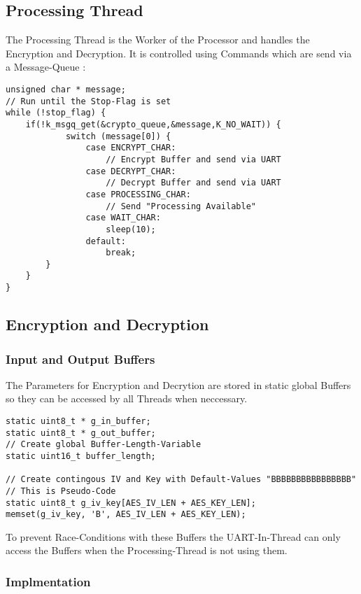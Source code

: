 \pagebreak

\subsection{Processing Thread}

The Processing Thread is the Worker of the Processor and handles the
Encryption and Decryption.
It is controlled using Commands which are send via a Message-Queue :

\begin{lstlisting}[style=CStyle,caption=Processing Thread Pseudo-Code]
unsigned char * message;
// Run until the Stop-Flag is set
while (!stop_flag) {
	if(!k_msgq_get(&crypto_queue,&message,K_NO_WAIT)) {
			switch (message[0]) {
				case ENCRYPT_CHAR:
					// Encrypt Buffer and send via UART
				case DECRYPT_CHAR:
					// Decrypt Buffer and send via UART
				case PROCESSING_CHAR:
					// Send "Processing Available"
				case WAIT_CHAR:
					sleep(10);
				default:
					break;
		}
	}
}
\end{lstlisting}

\subsection{Encryption and Decryption}

\subsubsection{Input and Output Buffers}

The Parameters for Encryption and Decrytion are stored in static global
Buffers so they can be accessed by all Threads when neccessary.

\begin{lstlisting}[style=CStyle,caption=Global Buffers for Encryption and Decryption]
static uint8_t * g_in_buffer;
static uint8_t * g_out_buffer;
// Create global Buffer-Length-Variable
static uint16_t buffer_length;

// Create contingous IV and Key with Default-Values "BBBBBBBBBBBBBBBB"
// This is Pseudo-Code
static uint8_t g_iv_key[AES_IV_LEN + AES_KEY_LEN];
memset(g_iv_key, 'B', AES_IV_LEN + AES_KEY_LEN);
\end{lstlisting}

To prevent Race-Conditions with these Buffers the UART-In-Thread can only
access the Buffers when the Processing-Thread is not using them.

\pagebreak

\subsubsection{Implmentation}

